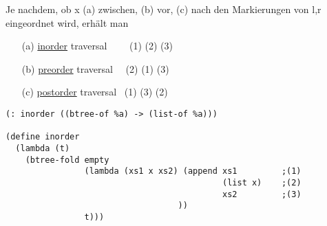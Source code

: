 \documentclass[a4paper,12pt]{article}
\begin{document}
Je nachdem, ob x (a) zwischen, (b) vor, (c) nach den Markierungen von l,r eingeordnet wird, erhält man 
\begin{itemize}
\item[(a)] \uline{inorder} traversal \ \ \ \ (1) (2) (3)
\item[(b)] \uline{preorder} traversal \ \ (2) (1) (3) 
\item[(c)] \uline{postorder} traversal \ (1) (3) (2)
\end{itemize}
\begin{lstlisting}[style=customc]
(: inorder ((btree-of %a) -> (list-of %a)))

(define inorder
  (lambda (t)
    (btree-fold empty
                (lambda (xs1 x xs2) (append xs1         ;(1)
                                            (list x)    ;(2)
                                            xs2         ;(3)
                                   )) 
                t)))
\end{lstlisting}
\\
\end{document}
